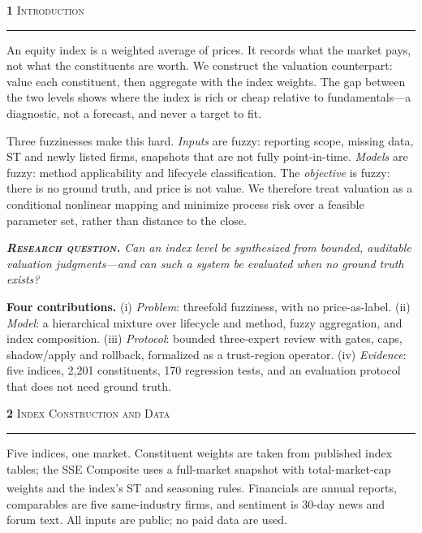 \documentclass[10pt]{article}
\newcommand{\sectnumfont}{\fontsize{33}{35}\selectfont\bfseries}
\newcommand{\secttitlefont}{\fontsize{31}{35}\selectfont\scshape\addfontfeatures{LetterSpace=6}}
\newcommand{\citex}[1]{\textsuperscript{\fontsize{14}{14}\selectfont[#1]}}
\newcommand{\postersection}[2]{%
  \par\vspace{10.2mm}%
  \noindent
  {\color{burgundy}\sectnumfont #1}\hspace{5mm}%
  {\color{oxford}\secttitlefont #2}\par
  \vspace{2.2mm}%
  {\color{gold}\rule{\linewidth}{0.55pt}}\par
  \vspace{3.4mm}%
}
\begin{document}
\noindent\hspace*{24mm}%
\begin{minipage}[t]{385.5mm}\RaggedRight

\postersection{1}{Introduction}
An equity index is a weighted average of prices. It records what the market
pays, not what the constituents are worth. We construct the valuation
counterpart: value each constituent, then aggregate with the index weights.
The gap between the two levels shows where the index is rich or cheap relative
to fundamentals---a diagnostic, not a forecast, and never a target to fit.

Three fuzzinesses make this hard. \textit{Inputs} are fuzzy: reporting scope,
missing data, ST and newly listed firms, snapshots that are not fully
point-in-time. \textit{Models} are fuzzy: method applicability and lifecycle
classification. The \textit{objective} is fuzzy: there is no ground truth, and
price is not value. We therefore treat valuation as a conditional nonlinear
mapping and minimize process risk over a feasible parameter set, rather than
distance to the close.

\begin{tcolorbox}[enhanced, colback=white!35!parchment, colframe=white!35!parchment,
  boxrule=0pt, leftrule=1.8pt, arc=0mm, left=4mm, right=3mm, top=2.6mm, bottom=2.6mm]
{\fontsize{23}{28}\selectfont\color{oxford}\itshape
\textbf{\textsc{Research question.}} Can an index level be synthesized from
bounded, auditable valuation judgments---and can such a system be evaluated
when no ground truth exists?}
\end{tcolorbox}

\textbf{Four contributions.} (i) \textit{Problem}: threefold fuzziness, with no
price-as-label. (ii) \textit{Model}: a hierarchical mixture over lifecycle and
method, fuzzy aggregation, and index composition. (iii) \textit{Protocol}:
bounded three-expert review with gates, caps, shadow/apply and rollback,
formalized as a trust-region operator. (iv) \textit{Evidence}: five indices,
2,201 constituents, 170 regression tests, and an evaluation protocol that does
not need ground truth.

\postersection{2}{Index Construction and Data}
Five indices, one market. Constituent weights are taken from published index
tables; the SSE Composite uses a full-market snapshot with total-market-cap
weights and the index's ST and seasoning rules\citex{6}. Financials are annual
reports, comparables are five same-industry firms, and sentiment is 30-day news
and forum text. All inputs are public; no paid data are used.


\end{minipage}
\end{document}
